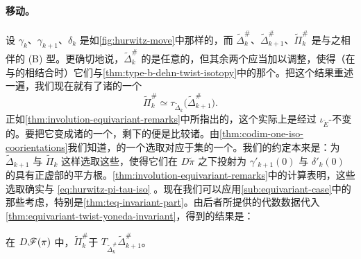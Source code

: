 \paragraph{\trHurwitz{}移动。}\label{sub:hurwitz-moves}
设 $\gamma_k$、$\gamma_{k+1}$、$\delta_k$ 是如\cref{fig:hurwitz-move}中那样的\trVanishingPath，而 $\widetilde{\Delta}^{\#}_k$、$\widetilde{\Delta}^{\#}_{k+1}$、$\widetilde{\Pi}^{\#}_k$ 是与之相伴的 (B) 型\trBrane。更确切地说，$\widetilde{\Delta}^{\#}_k$ 的\trGrading{}是任意的，但其余两个\trGrading{}应当加以调整，使得（在与\trDehnTwist{}的\trCanonical\trGrading{}相结合时）它们与\cref{thm:type-b-dehn-twist-isotopy}中的那个\trIsotopy{}\trCompatible。把这个结果重述一遍，我们现在就有了诸\trBrane{}的一个\trIsotopy
\begin{equation}\label{eq:hurwitz-pi-tau-iso}
\widetilde{\Pi}^{\#}_k\simeq\tau_{\widetilde{\Delta}_k}\bigl(\widetilde{\Delta}^{\#}_{k+1}\bigr).
\end{equation}
正如\cref{thm:involution-equivariant-remarks}中所指出的，这个\trIsotopy{}实际上是经过 $\iota_{\widetilde{E}}$-不变\trLagrange\trSubmanifold{}的。要把它变成诸\trEquivariant\trBrane{}的一个\trIsotopy，剩下的便是比较诸\trEquivariant\trPinStructure。由\cref{thm:codim-one-iso-coorientations}我们知道，\trEquivariant\trPinStructure{}的一个选取对应于\trFixedPoint{}集的一个\trCoorientation。我们的约定本来是：为 $\widetilde{\Delta}_{k+1}$ 与 $\widetilde{\Pi}_k$ 这样选取这些\trCoorientation，使得它们在 $D\tilde{\pi}$ 之下投射为 $\gamma'_{k+1}(0)$ 与 $\delta'_k(0)$ 的具有正虚部的平方根。\cref{thm:involution-equivariant-remarks}中的计算表明，这些选取确实与 \eqref{eq:hurwitz-pi-tau-iso} \trCompatible。现在我们可以应用\cref{sub:equivariant-case}中的那些考虑，特别是\cref{thm:teq-invariant-part}。由后者所提供的代数数据代入\cref{thm:equivariant-twist-yoneda-invariant}，得到的结果是：
\begin{proposition}\label{thm:hurwitz-pi-twist-isomorphic}
在 $D\mathscr{F}(\pi)$ 中，$\widetilde{\Pi}^{\#}_k$\trIsomorphic{}于 $T_{\widetilde{\Delta}^{\#}_k}\widetilde{\Delta}^{\#}_{k+1}$。
\end{proposition}
\noqed
